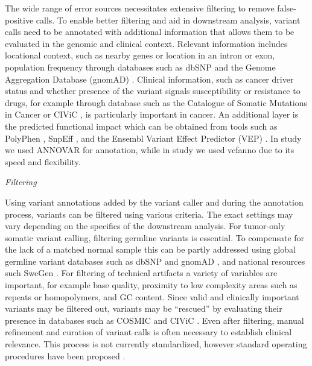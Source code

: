 \documentclass[11pt]{book}
\begin{document}
The wide range of error sources necessitates extensive filtering to remove false-positive calls. To enable better filtering and aid in downstream analysis, variant calls need to be annotated with additional information that allows them to be evaluated in the genomic and clinical context. Relevant information includes locational context, such as nearby genes or location in an intron or exon, population frequency through databases such as dbSNP \cite{Sherry:2001-dbSNP} and the Genome Aggregation Database (gnomAD) \cite{Karczewski:2020}. Clinical information, such as cancer driver status and whether presence of the variant signals susceptibility or resistance to drugs, for example through database such as the Catalogue of Somatic Mutations in Cancer \cite{Forbes:2015, Sondka:2018-COSMIC} or CIViC \cite{Griffith:2017}, is particularly important in cancer. An additional layer is the predicted functional impact which can be obtained from tools such as PolyPhen \cite{Adzhubei:2010}, SnpEff \cite{Cingolani:2012-SnpEff}, and the Ensembl Variant Effect Predictor (VEP) \cite{McLaren:2016}. In study \I we used ANNOVAR \cite{Wang:2010} for annotation, while in study \IV we used vcfanno \cite{Pedersen:2016} due to its speed and flexibility.

\vspace{1em}
\textit{Filtering}

Using variant annotations added by the variant caller and during the annotation process, variants can be filtered using various criteria. The exact settings may vary depending on the specifics of the downstream analysis. For tumor-only somatic variant calling, filtering germline variants is essential. To compensate for the lack of a matched normal sample this can be partly addressed using global germline variant databases such as dbSNP \cite{Sherry:2001-dbSNP} and gnomAD \cite{Karczewski:2020}, and national resources such SweGen \cite{Ameur:2017}. For filtering of technical artifacts a variety of variables are important, for example base quality, proximity to low complexity areas such as repeats or homopolymers, and GC content. Since valid and clinically important variants may be filtered out, variants may be ``rescued'' by evaluating their presence in databases such as COSMIC \cite{Forbes:2015} and CIViC \cite{Griffith:2017}. Even after filtering, manual refinement and curation of variant calls is often necessary to establish clinical relevance. This process is not currently standardized, however standard operating procedures have been proposed \cite{Barnell:2019, Danos:2019}.
\end{document}
